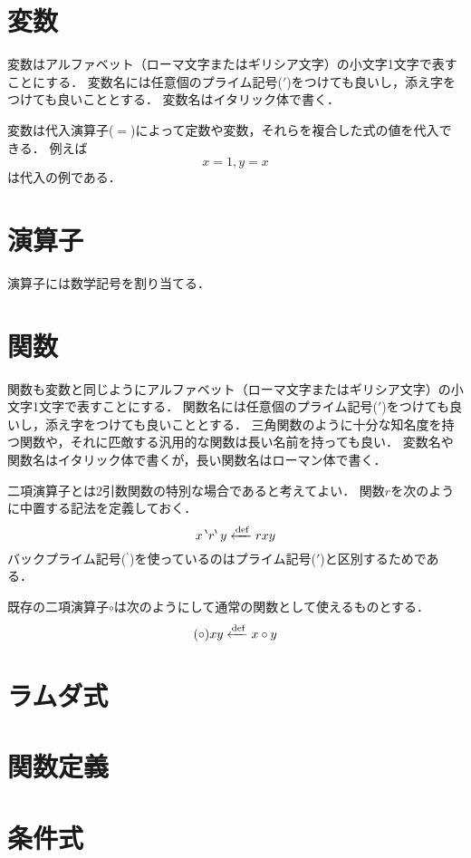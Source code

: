 \documentclass[twocolumn]{jsbook}
\begin{document}
\section{変数}

変数はアルファベット（ローマ文字またはギリシア文字）の小文字1文字で表すことにする．
変数名には任意個のプライム記号($'$)をつけても良いし，添え字をつけても良いこととする．
変数名はイタリック体で書く．

変数は代入演算子($=$)によって定数や変数，それらを複合した式の値を代入できる．
例えば $$x=1, y=x$$ は代入の例である．

\section{演算子}

演算子には数学記号を割り当てる．


\section{関数}

関数も変数と同じようにアルファベット（ローマ文字またはギリシア文字）の小文字1文字で表すことにする．
関数名には任意個のプライム記号($'$)をつけても良いし，添え字をつけても良いこととする．
三角関数のように十分な知名度を持つ関数や，それに匹敵する汎用的な関数は長い名前を持っても良い．
変数名や関数名はイタリック体で書くが，長い関数名はローマン体で書く．


二項演算子とは2引数関数の特別な場合であると考えてよい．
関数$r$を次のように中置する記法を定義しておく．
$$x\,{}^\backprime r^\backprime\,y\xleftarrow{\text{def}} rxy$$
バックプライム記号(${}^\backprime$)を使っているのはプライム記号($'$)と区別するためである．

既存の二項演算子$\circ$は次のようにして通常の関数として使えるものとする．
$$(\circ)xy\xleftarrow{\text{def}} x\circ y$$

\section{ラムダ式}


\section{関数定義}



\section{条件式}
\end{document}
